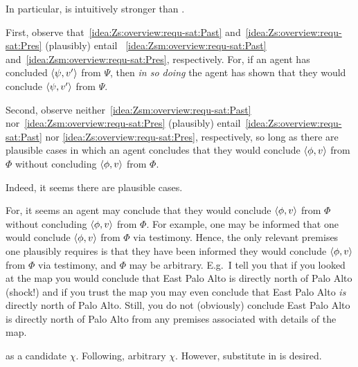 \begin{note}
  In particular, \iZS{} is intuitively stronger than \iZSm{}.

  First, observe that~\ref{idea:Zs:overview:requ-sat:Past} and~\ref{idea:Zs:overview:requ-sat:Pres} (plausibly) entail ~\ref{idea:Zsm:overview:requ-sat:Past} and~\ref{idea:Zsm:overview:requ-sat:Pres}, respectively.
  For, if an agent has concluded \(\langle \psi, v' \rangle\) from \(\Psi\), then \emph{in so doing} the agent has shown that they would conclude \(\langle \psi, v' \rangle\) from \(\Psi\).

  Second, observe neither~\ref{idea:Zsm:overview:requ-sat:Past} nor~\ref{idea:Zsm:overview:requ-sat:Pres} (plausibly) entail~\ref{idea:Zs:overview:requ-sat:Past} nor \ref{idea:Zs:overview:requ-sat:Pres}, respectively, so long as there are plausible cases in which an agent concludes that they would conclude \(\langle \phi, v \rangle\) from \(\Phi\) without concluding \(\langle \phi, v \rangle\) from \(\Phi\).

  Indeed, it seems there are plausible cases.

  For, it seems an agent may conclude that they would conclude \(\langle \phi, v \rangle\) from \(\Phi\) without concluding \(\langle \phi, v \rangle\) from \(\Phi\).
  For example, one may be informed that one would conclude \(\langle \phi, v \rangle\) from \(\Phi\) via testimony.
  Hence, the only relevant premises one plausibly requires is that they have been informed they would conclude \(\langle \phi, v \rangle\) from \(\Phi\) via testimony, and \(\Phi\) may be arbitrary.
  E.g.\ I tell you that if you looked at the map you would conclude that East Palo Alto is directly north of Palo Alto (shock!) and if you trust the map you may even conclude that East Palo Alto \emph{is} directly north of Palo Alto.
  Still, you do not (obviously) conclude East Palo Alto is directly north of Palo Alto from any premises associated with details of the map.
\end{note}

\begin{note}
  \iZSm{} as a candidate \(\chi\).
  {
    \color{red}
    Following, arbitrary \(\chi\).
    However, substitute in \iZSm{} is desired.
  }
\end{note}

